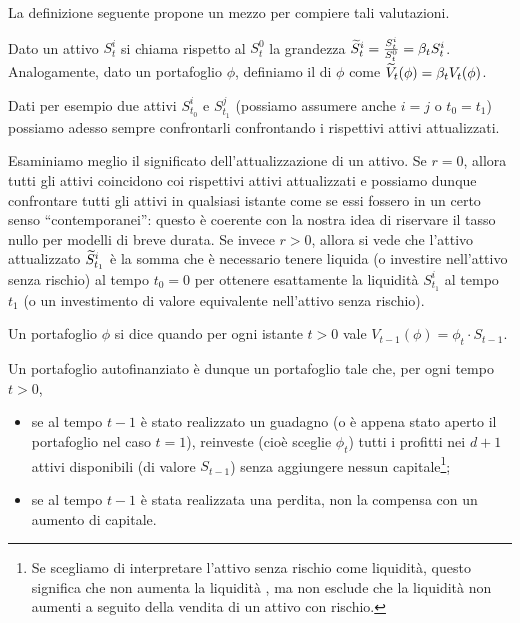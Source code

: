 \par La definizione seguente propone un mezzo per compiere tali valutazioni.
\begin{Definition}
	Dato un attivo $S^i_t$ si chiama  rispetto al  $S^0_t$ la grandezza $\widetilde{S}^i_t = \frac{S^i_t}{S^0_t} = \beta_t S^i_t$. Analogamente, dato un portafoglio $\phi$, definiamo il  di $\phi$ come $\widetilde{V}_t(\phi) = \beta_t V_t(\phi)$.
\end{Definition}
\par Dati per esempio due attivi $S^i_{t_0}$ e $S^j_{t_1}$ (possiamo assumere anche $i = j$ o $t_0 = t_1$) possiamo adesso sempre confrontarli confrontando i rispettivi attivi attualizzati.
\par Esaminiamo meglio il significato dell'attualizzazione di un attivo. Se $r = 0$, allora tutti gli attivi coincidono coi rispettivi attivi attualizzati e possiamo dunque confrontare tutti gli attivi in qualsiasi istante come se essi fossero in un certo senso ``contemporanei'': questo \`e coerente con la nostra idea di riservare il tasso nullo per modelli di breve durata. Se invece $r > 0$, allora si vede che l'attivo attualizzato $\widetilde{S}^i_{t_1}$ \`e la somma che \`e necessario tenere liquida (o investire nell'attivo senza rischio) al tempo $t_0 = 0$ per ottenere esattamente la liquidit\`a $S^i_{t_1}$ al tempo $t_1$ (o un investimento di valore equivalente nell'attivo senza rischio).
\begin{Definition}
	Un portafoglio $\phi$ si dice  quando per ogni istante $t > 0$ vale $V_{t - 1}(\phi) = \phi_t \cdot S_{t - 1}$.
\end{Definition}
\par Un portafoglio autofinanziato \`e dunque un portafoglio tale che, per ogni tempo $t > 0$,
\begin{itemize}
	\item se al tempo $t - 1$ \`e stato realizzato un guadagno (o \`e appena stato aperto il portafoglio nel caso $t = 1$), reinveste (cio\`e sceglie $\phi_t$) tutti i profitti nei $d + 1$ attivi disponibili (di valore $S_{t - 1}$) senza aggiungere nessun capitale\footnote{Se scegliamo di interpretare l'attivo senza rischio come liquidit\`a, questo significa che non aumenta la liquidit\`a , ma non esclude che la liquidit\`a non aumenti a seguito della vendita di un attivo con rischio.};
	\item se al tempo $t - 1$ \`e stata realizzata una perdita, non la compensa con un aumento di capitale.
\end{itemize}

